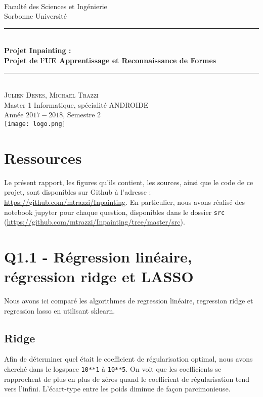 \documentclass[a4paper, 10pt]{article}
\newcommand{\HRule}{\rule{\linewidth}{0.5mm}}
\begin{document}
\begin{titlepage}
\begin{center}
~\\[1cm]
\Large Faculté des Sciences et Ingénierie\\Sorbonne Université\\[3.5cm]
\HRule 
\\[0.4cm]{\huge \bfseries Projet Inpainting :\\[0.1cm] Projet de l'UE Apprentissage et Reconnaissance de Formes\\[0.4cm]}
\HRule \\[1cm] 
\Large \textsc{Julien Denes, Michaël Trazzi} \\[2cm]
\Large Master 1 Informatique, spécialité ANDROIDE\\Année $2017-2018$, Semestre 2 \\[5cm]
\texttt{[image: logo.png]}
\end{center}
\end{titlepage}

\section*{Ressources}

Le présent rapport, les figures qu'ils contient, les sources, ainsi que le code de ce projet, sont disponibles sur Github à l'adresse : \url{https://github.com/mtrazzi/Inpainting}. En particulier, nous avons réalisé des notebook jupyter pour chaque question, disponibles dans le dossier \verb|src| (\url{https://github.com/mtrazzi/Inpainting/tree/master/src}).

\section*{Q1.1 - Régression linéaire, régression ridge et LASSO}

Nous avons ici comparé les algorithmes de regression linéaire, regression ridge et regression lasso en utilisant sklearn.

\subsection*{Ridge}

Afin de déterminer quel était le coefficient de régularisation optimal, nous avons cherché dans le logspace \verb|10**1| à \verb|10**5|. On voit que les coefficients se rapprochent de plus en plus de zéros quand le coefficient de régularisation tend vers l'infini. L'écart-type entre les poids diminue de façon parcimonieuse.
\end{document}
